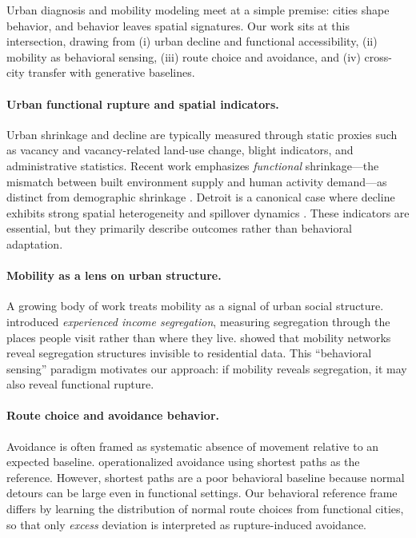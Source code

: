 Urban diagnosis and mobility modeling meet at a simple premise: cities shape behavior, and behavior leaves spatial signatures. Our work sits at this intersection, drawing from (i) urban decline and functional accessibility, (ii) mobility as behavioral sensing, (iii) route choice and avoidance, and (iv) cross-city transfer with generative baselines.

\paragraph{Urban functional rupture and spatial indicators.}
Urban shrinkage and decline are typically measured through static proxies such as vacancy and vacancy-related land-use change, blight indicators, and administrative statistics. Recent work emphasizes \emph{functional} shrinkage---the mismatch between built environment supply and human activity demand---as distinct from demographic shrinkage \citep{ma2020functional}. Detroit is a canonical case where decline exhibits strong spatial heterogeneity and spillover dynamics \citep{meng2025detroit,lokhande2023spillover}. These indicators are essential, but they primarily describe outcomes rather than behavioral adaptation.

\paragraph{Mobility as a lens on urban structure.}
A growing body of work treats mobility as a signal of urban social structure. \citet{moro2021mobility} introduced \emph{experienced income segregation}, measuring segregation through the places people visit rather than where they live. \citet{nilforoshan2023mobility} showed that mobility networks reveal segregation structures invisible to residential data. This ``behavioral sensing'' paradigm motivates our approach: if mobility reveals segregation, it may also reveal functional rupture.

\paragraph{Route choice and avoidance behavior.}
Avoidance is often framed as systematic absence of movement relative to an expected baseline. \citet{eftelioglu2018avoidance} operationalized avoidance using shortest paths as the reference. However, shortest paths are a poor behavioral baseline because normal detours can be large even in functional settings. Our behavioral reference frame differs by learning the distribution of normal route choices from functional cities, so that only \emph{excess} deviation is interpreted as rupture-induced avoidance.

